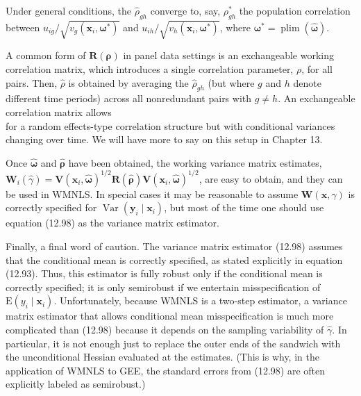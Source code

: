 \documentclass[10pt]{article}
\begin{document}
Under general conditions, the $\hat{\rho}_{g h}$ converge to, say, $\rho_{g h}^{*}$ the population correlation between $u_{i g} / \sqrt{v_{g}\left(\mathbf{x}_{i}, \boldsymbol{\omega}^{*}\right)}$ and $u_{i h} / \sqrt{v_{h}\left(\mathbf{x}_{i}, \boldsymbol{\omega}^{*}\right)}$, where $\boldsymbol{\omega}^{*}=\operatorname{plim}(\hat{\boldsymbol{\omega}})$.

A common form of $\mathbf{R}(\boldsymbol{\rho})$ in panel data settings is an exchangeable working correlation matrix, which introduces a single correlation parameter, $\rho$, for all pairs. Then, $\hat{\rho}$ is obtained by averaging the $\hat{\rho}_{g h}$ (but where $g$ and $h$ denote different time periods) across all nonredundant pairs with $g \neq h$. An exchangeable correlation matrix allows\\
for a random effects-type correlation structure but with conditional variances changing over time. We will have more to say on this setup in Chapter 13.

Once $\hat{\boldsymbol{\omega}}$ and $\hat{\boldsymbol{\rho}}$ have been obtained, the working variance matrix estimates, $\mathbf{W}_{i}(\hat{\gamma})=\mathbf{V}\left(\mathbf{x}_{i}, \hat{\boldsymbol{\omega}}\right)^{1 / 2} \mathbf{R}(\hat{\boldsymbol{\rho}}) \mathbf{V}\left(\mathbf{x}_{i}, \hat{\boldsymbol{\omega}}\right)^{1 / 2}$, are easy to obtain, and they can be used in WMNLS. In special cases it may be reasonable to assume $\mathbf{W}(\mathbf{x}, \gamma)$ is correctly specified for $\operatorname{Var}\left(\mathbf{y}_{i} \mid \mathbf{x}_{i}\right)$, but most of the time one should use equation (12.98) as the variance matrix estimator.

Finally, a final word of caution. The variance matrix estimator (12.98) assumes that the conditional mean is correctly specified, as stated explicitly in equation (12.93). Thus, this estimator is fully robust only if the conditional mean is correctly specified; it is only semirobust if we entertain misspecification of $\mathrm{E}\left(y_{i} \mid \mathbf{x}_{i}\right)$. Unfortunately, because WMNLS is a two-step estimator, a variance matrix estimator that allows conditional mean misspecification is much more complicated than (12.98) because it depends on the sampling variability of $\hat{\gamma}$. In particular, it is not enough just to replace the outer ends of the sandwich with the unconditional Hessian evaluated at the estimates. (This is why, in the application of WMNLS to GEE, the standard errors from (12.98) are often explicitly labeled as semirobust.)
\end{document}
